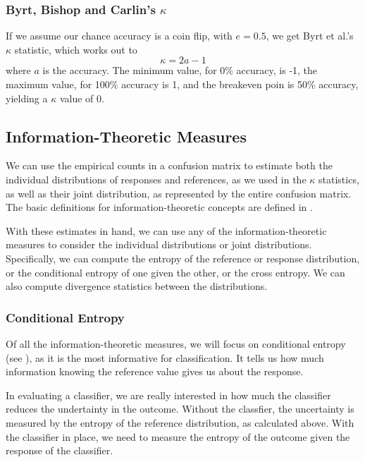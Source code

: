 \subsubsection{Byrt, Bishop and Carlin's $\kappa$}

If we assume our chance accuracy is a coin flip, with $e = 0.5$, 
we get Byrt et al.'s $\kappa$ statistic, which works out to
%
\begin{equation}
\kappa = 2 a - 1
\end{equation}
%
where $a$ is the accuracy.  The minimum value, for 0\% accuracy, is
-1, the maximum value, for 100\% accuracy is 1, and the breakeven poin
is 50\% accuracy, yielding a $\kappa$ value of 0.


\subsection{Information-Theoretic Measures}

We can use the empirical counts in a confusion matrix to estimate both
the individual distributions of responses and references, as we used
in the $\kappa$ statistics, as well as their joint distribution, as
represented by the entire confusion matrix.  The basic definitions for
information-theoretic concepts are defined in
.

With these estimates in hand, we can use any of the
information-theoretic measures to consider the individual
distributions or joint distributions.  Specifically, we can compute
the entropy of the reference or response distribution, or the
conditional entropy of one given the other, or the cross entropy.  We
can also compute divergence statistics between the distributions.

\subsubsection{Conditional Entropy}

Of all the information-theoretic measures, we will focus on
conditional entropy (see ), as it is
the most informative for classification.  It tells us how much
information knowing the reference value gives us about the response.

In evaluating a classifier, we are really interested in how much the
classifier reduces the undertainty in the outcome.  Without the classfier,
the uncertainty is measured by the entropy of the reference distribution,
as calculated above.  With the classifier in place, we need to measure
the entropy of the outcome given the response of the classifier.  

